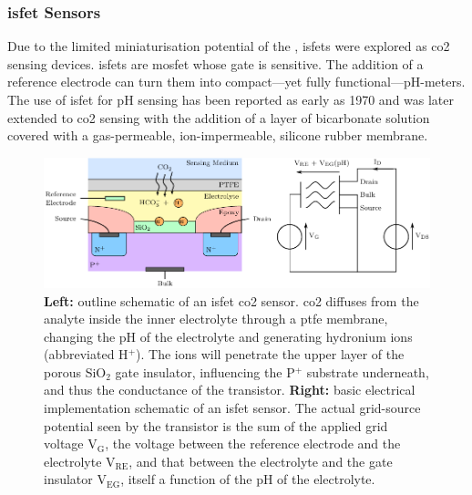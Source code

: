 \subsubsection{\texorpdfstring{\gls{isfet}}{ISFET} Sensors}\label{subsect:choos:review:isfet}

Due to the limited miniaturisation potential of the \ssel, \glspl{isfet} were explored as \gls{co2} sensing devices. \glspl{isfet} are \gls{mosfet} whose gate is  sensitive. The addition of a reference electrode can turn them into compact---yet fully functional---pH-meters. The use of \gls{isfet} for pH sensing has been reported as early as 1970\cite{bergveld1970} and was later extended to \gls{co2} sensing with the addition of a layer of bicarbonate solution covered with a gas-permeable, ion-impermeable, silicone rubber membrane\cite{hu1989}.

\begin{figure}
	\centering
	\includegraphics[width=\linewidth]{1_main_matter/choos_figures/review/isfet_converted}
	\caption[\gls{isfet} sensors.]{\textbf{Left:} outline schematic of an \gls{isfet} \gls{co2} sensor. \gls{co2} diffuses from the analyte inside the inner electrolyte through a \gls{ptfe} membrane, changing the pH of the electrolyte and generating hydronium ions (abbreviated H$^+$). The ions will penetrate the upper layer of the porous SiO$_2$ gate insulator, influencing the P$^+$ substrate underneath, and thus the conductance of the transistor. \textbf{Right:} basic electrical implementation schematic of an \gls{isfet} sensor. The actual grid-source potential seen by the transistor is the sum of the applied grid voltage V$_\text{G}$, the voltage between the reference electrode and the electrolyte V$_\text{RE}$, and that between the electrolyte and the gate insulator V$_\text{EG}$, itself a function of the pH of the electrolyte.}
	\label{fig:choos:review:isfet}
\end{figure}

